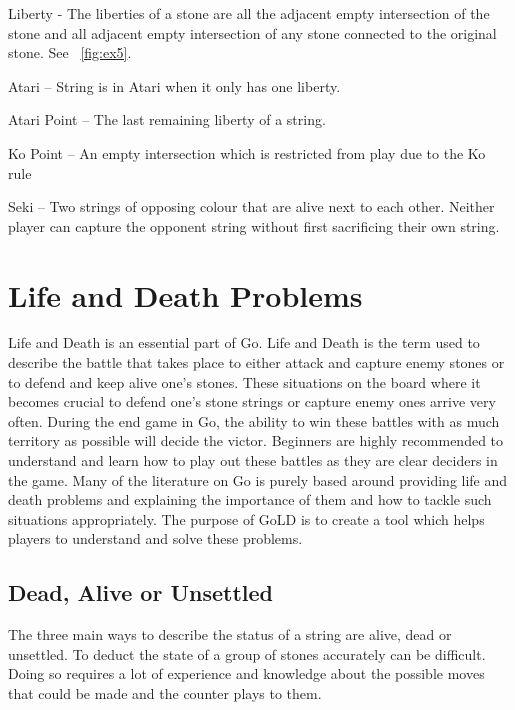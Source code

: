 \documentclass{l4proj}
\begin{document}
Liberty - The liberties of a stone are all the adjacent empty intersection of the stone and all adjacent empty intersection of any stone connected to the original stone. See ~\autoref{fig:ex5}.





Atari – String is in Atari when it only has one liberty.

Atari Point – The last remaining liberty of a string.

Ko Point –  An empty intersection which is restricted from play due to the Ko rule

Seki – Two strings of opposing colour that are alive next to each other. Neither player can capture the opponent string without first sacrificing their own string.





\section{Life and Death Problems}

Life and Death is an essential part of Go. Life and Death is the term used to describe the battle that takes place to either attack and capture enemy stones or to defend and keep alive one's stones.  These situations on the board where it becomes crucial to defend one’s stone strings or capture enemy ones arrive very often. During the end game in Go, the ability to win these battles with as much territory as possible will decide the victor. Beginners are highly recommended to understand and learn how to play out these battles as they are clear deciders in the game. Many of the literature on Go is purely based around providing life and death problems and explaining the importance of them and how to tackle such situations appropriately.\cite{Cho1993}\cite{Davies1975} The purpose of GoLD is to create a tool which helps players to understand and solve these problems.

\subsection{Dead, Alive or Unsettled}

The three main ways to describe the status of a string are alive, dead or unsettled. To deduct the state of a group of stones accurately can be difficult. Doing so requires a lot of experience and knowledge about the possible moves that could be made and the counter plays to them.
\end{document}
